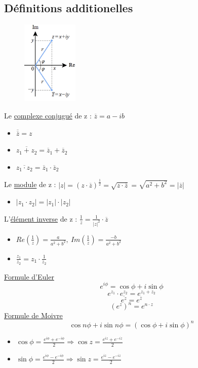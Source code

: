 \documentclass{article}
\begin{document}
\subsection{Définitions additionelles}
\begin{figure}[htp]
    \centering
    \includegraphics[height=4cm]{Images/conjugue.png}
    \label{fig:conjugue}
\end{figure}
Le \underline{complexe conjugué} de z : \( \overline{z} = a - ib\) \\
\begin{itemize}
    \item \( \overline{\overline{z}} = z \)
    \item \( \overline{z_1 + z_2} = \overline{z}_1+ \overline{z}_2 \)
    \item \( \overline{z_1 \cdot z_2} = \overline{z}_1 \cdot \overline{z}_2 \)
\end{itemize} \newpage
Le \underline{module} de z : \(|z| = (z\cdot\overline{z})^{\frac{1}{2}} = \sqrt{z\cdot\overline{z}} = \sqrt{a^2 + b^2} = |\overline{z}|\)
\begin{itemize}
    \item \( |z_1 \cdot z_2| = |z_1|\cdot|z_2| \)
\end{itemize}
L'\underline{élément inverse} de z : \(\frac{1}{z} = \frac{1}{|z|^2}\cdot\overline{z}\)
\begin{itemize}
    \item \(Re(\frac{1}{z}) = \frac{a}{a^2 + b^2}, \ Im(\frac{1}{z}) = \frac{-b}{a^2 + b^2} \)
    \item \( \frac{z_1}{z_2} = z_1 \cdot \frac{1}{z_2} \)
\end{itemize}
\underline{Formule d'Euler}
\[ e^{i\phi} = \cos{\phi} + i\sin{\phi} \]
\[ e^{z_1} \cdot e^{z_2} = e^{z_1 + z_2} \]
\[ \overline{e^z} = e^{\overline{z}} \]
\[ (e^z)^n = e^{n\cdot z} \]
\underline{Formule de Moivre}
\[ \cos{n\phi} + i\sin{n\phi} = (\cos{\phi} + i\sin{\phi})^n \]
\begin{itemize}
    \item \( \cos{\phi} = \frac{e^{i\phi} + e^{-i\phi}}{2} \Rightarrow \cos{z} = \frac{e^{iz} + e^{-iz}}{2} \)
    \item \( \sin{\phi} = \frac{e^{i\phi} - e^{-i\phi}}{2} \Rightarrow \sin{z} = \frac{e^{iz} - e^{-iz}}{2} \)
\end{itemize}
\end{document}
